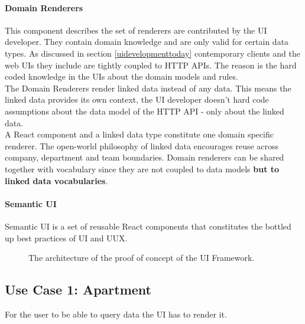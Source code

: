 \paragraph{Domain Renderers}
This component describes the set of renderers are contributed by the UI developer. They contain domain knowledge and are only valid for certain data types. As discussed in section \ref{uidevelopmenttoday} contemporary clients and the web UIs they include are tightly coupled to HTTP APIs. The reason is the hard coded knowledge in the UIs about the domain models and rules. \\
The Domain Renderers render linked data instead of any data. This means the linked data provides its own context, the UI developer doesn't hard code assumptions about the data model of the HTTP API - only about the linked data. \\
A React component and a linked data type constitute one domain specific renderer. The open-world philosophy of linked data encourages reuse across company, department and team boundaries. Domain renderers can be shared together with vocabulary since they are not coupled to data models \textbf{but to linked data vocabularies}.

\paragraph{Semantic UI}
Semantic UI is a set of reusable React components that constitutes the bottled up best practices of UI and UUX.

\begin{figure}[!htb]
  \caption{The architecture of the proof of concept of the UI Framework.}
\end{figure}

\subsection{Use Case 1: Apartment}
For the user to be able to query data the UI has to render it.

